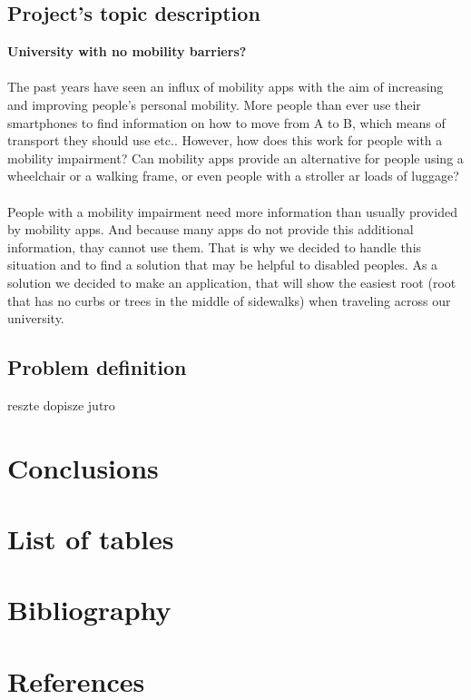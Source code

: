 \documentclass[12pt,letterpaper]{article}
\begin{document}
\subsection{Project's topic description}
\textbf{University with no mobility barriers?} \\\\
The past years have seen an influx of mobility apps with the aim of increasing and improving people's personal mobility. More people than ever use their smartphones to find information on how to move from A to B, which means of transport they should use etc.. However, how does this work for people with a mobility impairment? Can mobility apps provide an alternative for people using a wheelchair or a walking frame, or even people with a stroller ar loads of luggage?\\\\
People with a mobility impairment need more information than usually provided by mobility apps. And because many apps do not provide this additional information, thay cannot use them. That is why we decided to handle this situation and to find a solution that may be helpful to disabled peoples.
As a solution we decided to make an application, that will show the easiest root (root that has no curbs or trees in the middle of sidewalks) when traveling across our university. 

\subsection{Problem definition}
reszte dopisze jutro

\section{Conclusions}

\section{List of tables}

\section{Bibliography}

\section{References}
\end{document}
